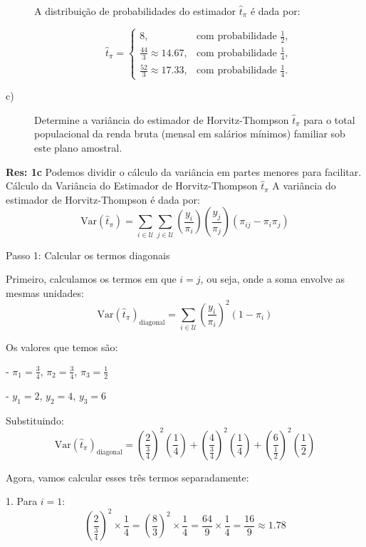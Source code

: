 \documentclass[a4paper,11pt,oneside,twocolumn]{Config/milktest}
\begin{document}
\begin{description}
{			A distribuição de probabilidades do estimador \(\hat{t}_\pi\) é dada por:
			
			\[
			\hat{t}_\pi =
			\begin{cases}
				8, & \text{com probabilidade } \frac{1}{2}, \\
				\frac{44}{3} \approx 14.67, & \text{com probabilidade } \frac{1}{4}, \\
				\frac{52}{3} \approx 17.33, & \text{com probabilidade } \frac{1}{4}.
			\end{cases}
			\]
		}
		\item[c)] Determine a variância do estimador de Horvitz-Thompson $\hat{t}_\pi$ para o total populacional da renda bruta (mensal em salários mínimos) familiar sob este plano amostral.
	\end{description}
	\medskip
	{\scriptsize
		
		\textbf{Res:  1c} Podemos dividir o cálculo da variância em partes menores para facilitar. Cálculo da Variância do Estimador de Horvitz-Thompson \(\hat{t}_\pi\) A variância do estimador de Horvitz-Thompson é dada por:
		\[
		\text{Var}(\hat{t}_\pi) = \sum_{i \in \mathcal{U}} \sum_{j \in \mathcal{U}} \left(\frac{y_i}{\pi_i}\right) \left(\frac{y_j}{\pi_j}\right) (\pi_{ij} - \pi_i \pi_j)
		\]
		
		Passo 1: Calcular os termos diagonais
		
		Primeiro, calculamos os termos em que \(i = j\), ou seja, onde a soma envolve as mesmas unidades:
		\[
		\text{Var}(\hat{t}_\pi)_{\text{diagonal}} = \sum_{i \in \mathcal{U}} \left(\frac{y_i}{\pi_i}\right)^2 (1 - \pi_i)
		\]
		
		Os valores que temos são:
		
		- \(\pi_1 = \frac{3}{4}\), \(\pi_2 = \frac{3}{4}\), \(\pi_3 = \frac{1}{2}\)
		
		- \(y_1 = 2\), \(y_2 = 4\), \(y_3 = 6\)
		
		Substituindo:
		\[
		\text{Var}(\hat{t}_\pi)_{\text{diagonal}} = \left(\frac{2}{\frac{3}{4}}\right)^2 \left(\frac{1}{4}\right) + \left(\frac{4}{\frac{3}{4}}\right)^2 \left(\frac{1}{4}\right) + \left(\frac{6}{\frac{1}{2}}\right)^2 \left(\frac{1}{2}\right)
		\]
		
		Agora, vamos calcular esses três termos separadamente:
		
		1. Para \(i = 1\):
		\[
		\left(\frac{2}{\frac{3}{4}}\right)^2 \times \frac{1}{4} = \left(\frac{8}{3}\right)^2 \times \frac{1}{4} = \frac{64}{9} \times \frac{1}{4} = \frac{16}{9} \approx 1.78
		\]
		
}
\end{document}
